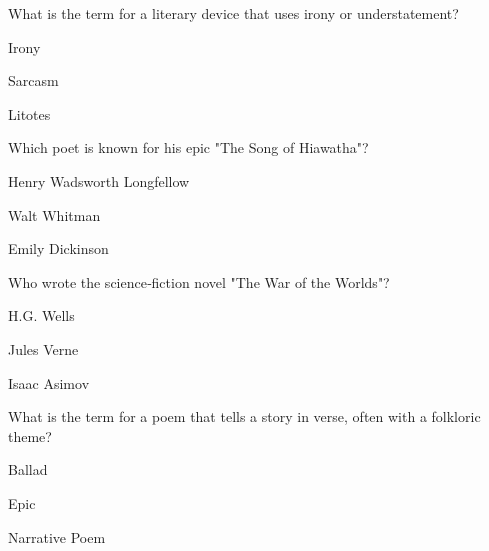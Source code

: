 \begin{enhancedmcq}{What is the term for a literary device that uses irony or understatement?}
\item Irony
\item Sarcasm
\item Litotes

\end{enhancedmcq}
\begin{enhancedmcq}{Which poet is known for his epic "The Song of Hiawatha"?}
\item Henry Wadsworth Longfellow
\item Walt Whitman
\item Emily Dickinson

\end{enhancedmcq}
\begin{enhancedmcq}{Who wrote the science‑fiction novel "The War of the Worlds"?}
\item H.G. Wells
\item Jules Verne
\item Isaac Asimov

\end{enhancedmcq}
\begin{enhancedmcq}{What is the term for a poem that tells a story in verse, often with a folkloric theme?}
\item Ballad
\item Epic
\item Narrative Poem
\end{enhancedmcq}